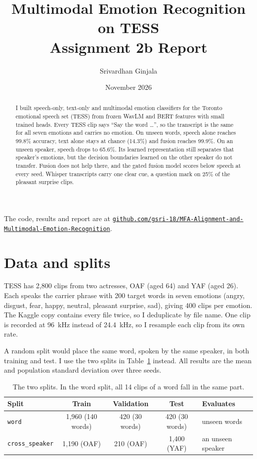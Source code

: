 \documentclass[11pt,a4paper]{article}
\title{\textbf{Multimodal Emotion Recognition on TESS}\\[2pt]\large Assignment 2b Report}
\author{Srivardhan Ginjala}
\date{November 2026}
\newcommand{\code}[1]{\texttt{#1}}
\newcommand{\repo}{gsri-18/MFA-Alignment-and-Multimodal-Emotion-Recognition}
\begin{document}
\maketitle

\begin{center}\small
The code, results and report are at \href{https://github.com/\repo}{\texttt{github.com/\repo}}.
\end{center}

\begin{abstract}
\noindent I built speech-only, text-only and multimodal emotion classifiers for the Toronto emotional speech set (TESS)
from frozen WavLM and BERT features with small trained heads. Every TESS clip says ``Say the word \ldots'', so the
transcript is the same for all seven emotions and carries no emotion. On unseen words, speech alone reaches 99.8\%
accuracy, text alone stays at chance (14.3\%) and fusion reaches 99.9\%. On an unseen speaker, speech drops to 65.6\%.
Its learned representation still separates that speaker's emotions, but the decision boundaries learned on the other
speaker do not transfer. Fusion does not help there, and the gated fusion model scores below speech at every seed.
Whisper transcripts carry one clear cue, a question mark on 25\% of the pleasant surprise clips.
\end{abstract}

\section{Data and splits}

TESS has 2{,}800 clips from two actresses, OAF (aged 64) and YAF (aged 26). Each speaks the carrier phrase with 200
target words in seven emotions (angry, disgust, fear, happy, neutral, pleasant surprise, sad), giving 400 clips per
emotion. The Kaggle copy contains every file twice, so I deduplicate by file name. One clip is recorded at 96~kHz
instead of 24.4~kHz, so I resample each clip from its own rate.

A random split would place the same word, spoken by the same speaker, in both training and test. I use the two splits
in Table~\ref{tab:splits} instead. All results are the mean and population standard deviation over three seeds.

\begin{table}[htbp]
\centering\small
\caption{The two splits. In the word split, all 14 clips of a word fall in the same part.}
\label{tab:splits}
\begin{tabular}{lcccl}
\toprule
Split & Train & Validation & Test & Evaluates \\
\midrule
\code{word} & 1{,}960 (140 words) & 420 (30 words) & 420 (30 words) & unseen words \\
\code{cross\_speaker} & 1{,}190 (OAF) & 210 (OAF) & 1{,}400 (YAF) & an unseen speaker \\
\bottomrule
\end{tabular}
\end{table}
\end{document}
